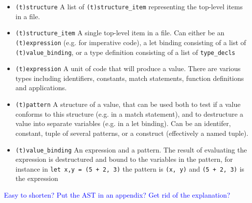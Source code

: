 \documentclass[12pt,twoside,notitlepage]{report}
\newcommand{\textinline}{\texttt}
\newcommand{\camlinline}{\texttt}
\newcommand\note[1]{\textcolor{blue}{#1}}
\begin{document}
\begin{itemize}
	\item \textinline{(t)structure} A list of \textinline{(t)structure_item} representing the top-level items in a file.
	\item \textinline{(t)structure_item} A single top-level item in a file. Can either be an \textinline{(t)expression} (e.g. for imperative code), a let binding consisting of a list of \textinline{(t)value_binding}, or a type definition consisting of a list of \textinline{type_decls}
	\item \textinline{(t)expression} A unit of code that will produce a value. There are various types including identifiers, constants, match statements, function definitions and applications.
	\item \textinline{(t)pattern} A structure of a value, that can be used both to test if a value conforms to this structure (e.g. in a match statement), and to destructure a value into separate variables (e.g. in a let binding). Can be an identifer, constant, tuple of several patterns, or a construct (effectively a named tuple).
	\item \textinline{(t)value_binding} An expression and a pattern. The result of evaluating the expression is destructured and bound to the variables in the pattern, for instance in \camlinline{let x,y = (5 + 2, 3)} the pattern is \camlinline{(x, y)} and \camlinline{(5 + 2, 3)} is the expression
\end{itemize}

\note{Easy to shorten?}
\note{Put the AST in an appendix? Get rid of the explanation?}
\end{document}
